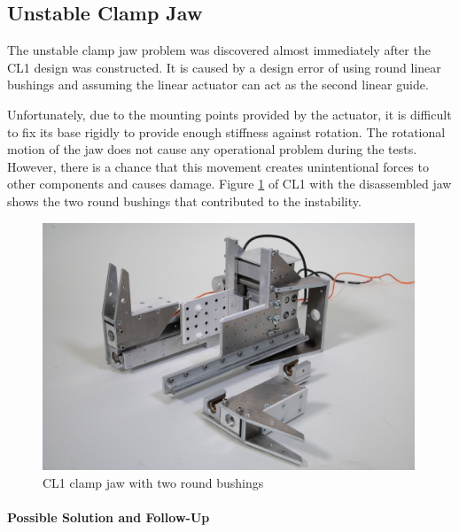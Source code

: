 \subsection{Unstable Clamp Jaw}
\label{subsection:exploration-1-unstable-clamp-jaw}

The unstable clamp jaw problem was discovered almost immediately after the CL1 design was constructed. It is caused by a design error of using round linear bushings and assuming the linear actuator can act as the second linear guide. 

Unfortunately, due to the mounting points provided by the actuator, it is difficult to fix its base rigidly to provide enough stiffness against rotation. The rotational motion of the jaw does not cause any operational problem during the tests. However, there is a chance that this movement creates unintentional forces to other components and causes damage. Figure \ref{fig:cl1-broken-jaw-photo} of CL1 with the disassembled jaw shows the two round bushings that contributed to the instability.

\begin{figure}
    \centering
    \includegraphics[width=0.99\textwidth]{images/04-4+5/cl1-broken-jaw.jpg}
    \caption{CL1 clamp jaw with two round bushings}
    \label{fig:cl1-broken-jaw-photo}
\end{figure}

\paragraph{Possible Solution and Follow-Up}

